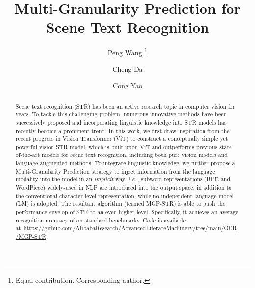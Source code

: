\documentclass[runningheads]{llncs}
\def\ie{\emph{i.e.}\,}
\begin{document}
\pagestyle{headings}
\mainmatter
\def\ECCVSubNumber{3821}  

\title{Multi-Granularity Prediction for Scene Text Recognition} 

\begin{comment}
\titlerunning{ECCV-22 submission ID \ECCVSubNumber} 
\authorrunning{ECCV-22 submission ID \ECCVSubNumber} 
\author{Anonymous ECCV submission}
\institute{Paper ID \ECCVSubNumber}
\end{comment}


\author{Peng Wang \thanks{Equal contribution.  Corresponding author.} \and
Cheng Da \and
Cong Yao  }

\maketitle

\begin{abstract}
Scene text recognition (STR) has been an active research topic in computer vision for years. To tackle this challenging problem, numerous innovative methods have been successively proposed and incorporating linguistic knowledge into STR models has recently become a prominent trend. In this work, we first draw inspiration from the recent progress in Vision Transformer (ViT) to construct a conceptually simple yet powerful vision STR model, which is built upon ViT and outperforms previous state-of-the-art models for scene text recognition, including both pure vision models and language-augmented methods. To integrate linguistic knowledge, we further propose a Multi-Granularity Prediction strategy to inject information from the language modality into the model in an \textit{implicit} way, \ie, subword representations (BPE and WordPiece) widely-used in NLP are introduced into the output space, in addition to the conventional character level representation, while no independent language model (LM) is adopted. The resultant algorithm (termed MGP-STR) is able to push the performance envelop of STR to an even higher level. Specifically, it achieves an average recognition accuracy of  on standard benchmarks. Code is available at~\url{https://github.com/AlibabaResearch/AdvancedLiterateMachinery/tree/main/OCR/MGP-STR}.
\end{abstract}
\end{document}
